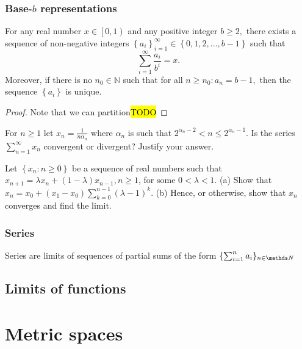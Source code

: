 \subsubsection{\label{subsec:baseBRepresentations}Base-$b$ representations}
\begin{thm}
\label{thm:realDecimalExpansion}For any real number $x\in\left[0,1\right)$
and any positive integer $b\geq2,$ there exists a sequence of non-negative
integers $\left\{ a_{i}\right\} _{i=1}^{\infty}\in\left\{ 0,1,2,\ldots,b-1\right\} $
such that 
\[
\sum_{i=1}^{\infty}\frac{a_{i}}{b^{i}}=x.
\]
Moreover, if there is no $n_{0}\in\mathbb{N}$ such that for all $n\geq n_{0}:a_{n}=b-1,$
then the sequence $\left\{ a_{i}\right\} $ is unique.
\end{thm}

\begin{proof}
Note that we can partition\hl{TODO}
\end{proof}
\begin{example}
\label{exa:isi2004samplepsb11}For $n\geq1$ let $x_{n}=\frac{1}{n\alpha_{n}}$
where $\alpha_{n}$ is such that $2^{\alpha_{n}-2}<n\leq2^{\alpha_{n}-1}$.
Is the series $\sum_{n=1}^{\infty}x_{n}$ convergent or divergent?
Justify your answer.
\end{example}

\begin{example}
	\label{exa:isi2009samplepsb2}
Let $\left\{x_n: n \geq 0\right\}$ be a sequence of real numbers such that $x_{n+1}=\lambda x_n+(1-\lambda) x_{n-1}, n \geq 1$, for some $0<\lambda<1$.
(a) Show that $x_n=x_0+\left(x_1-x_0\right) \sum_{k=0}^{n-1}(\lambda-1)^k$.
(b) Hence, or otherwise, show that $x_n$ converges and find the limit.
\end{example}

\subsubsection{Series}

Series are limits of sequences of partial sums of the form $\{\sum_{i=1}^n a_i \}_{n\in\N}$


\subsection{Limits of functions}



\section{Metric spaces}

